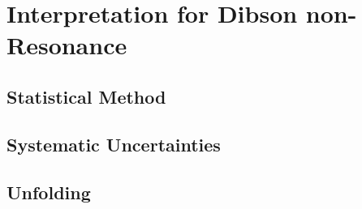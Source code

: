 \chapter{Interpretation for Dibson non-Resonance}
\section{Statistical Method}
\section{Systematic Uncertainties}
\section{Unfolding}